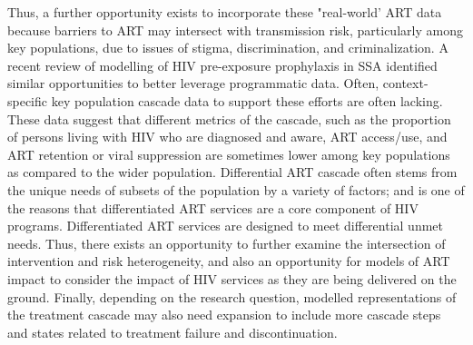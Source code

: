 \cite{Mountain2014,Lancaster2016,Green2020}
Thus, a further opportunity exists to incorporate these "real-world' ART data because barriers to ART may intersect with transmission risk,
particularly among key populations, due to issues of stigma, discrimination, and criminalization.  %
\cite{Ortblad2019,Baral2019}
A recent review of modelling of HIV pre-exposure prophylaxis in SSA\cite{Case2019} %
identified similar opportunities to better leverage programmatic data.
Often, context-specific key population cascade data to support these efforts are often lacking.\cite{Mountain2014}  %
These data suggest that different metrics of the cascade, such as the proportion of persons living with HIV who are diagnosed and aware, 
ART access/use, and ART retention or viral suppression are sometimes lower among key populations as compared to the wider population. %
Differential ART cascade often stems from the unique needs of subsets of the population by a variety of factors; and
is one of the reasons that differentiated ART services are a core component of HIV programs. %
Differentiated ART services are designed to meet differential unmet needs.
Thus, there exists an opportunity to further examine the intersection of intervention and risk heterogeneity, and also 
an opportunity for models of ART impact to consider the impact of HIV services as they are being delivered on the ground.
Finally, depending on the research question, modelled representations of the treatment cascade may also need expansion
to include more cascade steps and states related to treatment failure and discontinuation.

